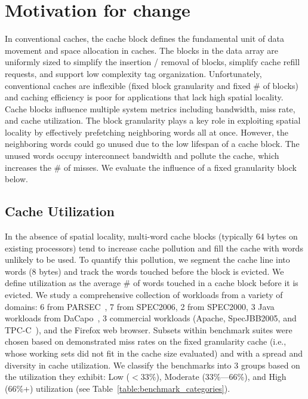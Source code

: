 \section{Motivation for change}

In conventional caches, the cache block defines the fundamental unit of data
movement and space allocation in caches. The blocks in the data array are
uniformly sized to simplify the insertion / removal of blocks, simplify cache
refill requests, and support low complexity tag organization. Unfortunately,
conventional caches are inflexible (fixed block granularity and fixed \# of
blocks) and caching efficiency is poor for applications that lack high spatial
locality.  Cache blocks influence multiple system metrics including bandwidth,
miss rate, and cache utilization. The block granularity plays a key role in
exploiting spatial locality by effectively prefetching neighboring words all
at once. However, the neighboring words could go unused due to the low
lifespan of a cache block. The unused words occupy interconnect bandwidth and
pollute the cache, which increases the \# of misses. We evaluate the influence
of a fixed granularity block below.

\subsection{Cache Utilization}

In the absence of spatial locality, multi-word cache blocks (typically 64
bytes on existing processors) tend to increase cache pollution and fill the
cache with words unlikely to be used.  To quantify this pollution, we segment
the cache line into words (8 bytes) and track the words touched before the
block is evicted.  We define utilization as the average \# of words touched in
a cache block before it is evicted. We study a comprehensive collection of
workloads from a variety of domains: 6 from PARSEC~\cite{Bienia:2008:PBS:1454115.1454128}, 7 from
SPEC2006, 2 from SPEC2000, 3 Java workloads from DaCapo~\cite{Blackburn:2006:DBJ:1167473.1167488}, 3
commercial workloads (Apache, SpecJBB2005, and TPC-C~\cite{Llanos:2006:TOT:1228268.1228270}), and the
Firefox web browser.  Subsets within benchmark suites were chosen based on
demonstrated miss rates on the fixed granularity cache (i.e., whose working
sets did not fit in the cache size evaluated) and with a spread and diversity
in cache utilization.  We classify the benchmarks into 3 groups
based on the utilization they exhibit: Low ($<$33\%), Moderate (33\%---66\%),
and High (66\%+) utilization (see Table~\ref{table:benchmark_categories}).

